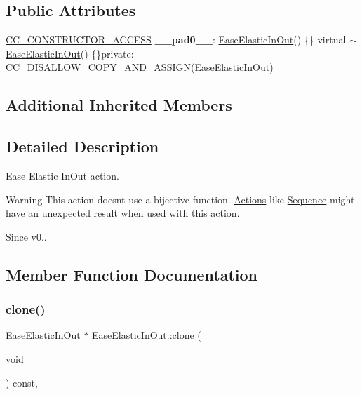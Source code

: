 \subsection*{Public Attributes}
\begin{DoxyCompactItemize}
\item 
\mbox{\label{classEaseElasticInOut_a3b43729d0796dca6b44dd632aeb45735}} 
\hyperlink{_2cocos2d_2cocos_2base_2ccConfig_8h_a25ef1314f97c35a2ed3d029b0ead6da0}{C\+C\+\_\+\+C\+O\+N\+S\+T\+R\+U\+C\+T\+O\+R\+\_\+\+A\+C\+C\+E\+SS} {\bfseries \+\_\+\+\_\+pad0\+\_\+\+\_\+}\+: \hyperlink{classEaseElasticInOut}{Ease\+Elastic\+In\+Out}() \{\} virtual $\sim$\hyperlink{classEaseElasticInOut}{Ease\+Elastic\+In\+Out}() \{\}private\+: C\+C\+\_\+\+D\+I\+S\+A\+L\+L\+O\+W\+\_\+\+C\+O\+P\+Y\+\_\+\+A\+N\+D\+\_\+\+A\+S\+S\+I\+GN(\hyperlink{classEaseElasticInOut}{Ease\+Elastic\+In\+Out})
\end{DoxyCompactItemize}
\subsection*{Additional Inherited Members}


\subsection{Detailed Description}
Ease Elastic In\+Out action. 

\begin{DoxyWarning}{Warning}
This action doesn\textquotesingle{}t use a bijective function. \hyperlink{classActions}{Actions} like \hyperlink{classSequence}{Sequence} might have an unexpected result when used with this action. 
\end{DoxyWarning}
\begin{DoxySince}{Since}
v0.. 
\end{DoxySince}


\subsection{Member Function Documentation}
\mbox{\label{classEaseElasticInOut_a3b008e59719729110c7965170788c0b4}} 
\subsubsection{\texorpdfstring{clone()}{clone()}}
{\footnotesize\ttfamily \hyperlink{classEaseElasticInOut}{Ease\+Elastic\+In\+Out} $\ast$ Ease\+Elastic\+In\+Out\+::clone (\begin{DoxyParamCaption}\item[{void}]{ }\end{DoxyParamCaption}) const\hspace{0.3cm}{\ttfamily [override]}, {\ttfamily [virtual]}}

